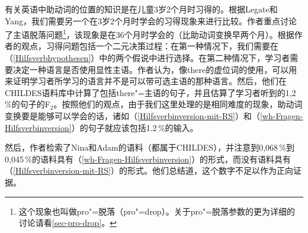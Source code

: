 \noindent
有关英语中助动词的位置的知识是在儿童3岁2个月时习得的。根据Legate和Yang，我们需要另一个在3岁2个月时学会的习得现象来进行比较。作者重点讨论了主语脱落问题\footnote{%
这个现象也叫做pro"=脱落（pro"=drop）。关于pro"=脱落参数的更为详细的讨论请看\ref{sec-pro-drop}。
}，该现象是在36个月时学会的（比助动词变换早两个月）。根据作者的观点，习得问题包括一个二元决策过程：在第一种情况下，我们需要在（\ref{Hilfsverbhypothesen}）中的两个假说中进行选择。在第二种情况下，学习者需要决定一种语言是否使用显性主语。作者认为，像there的虚位词的使用，可以用来证明学习者所学习的语言并不是可以带可选主语的那种语言。然后，他们在CHILDES语料库中计算了包括there"=主语的句子，并且估算了学习者听到的1,2\,\%的句子的F$_2$。按照他们的观点，由于我们这里处理的是相同难度的现象，助动词变换要是能够可以学会的话，诸如（\ref{Hilfsverbinversion-mit-RS}）和（\ref{wh-Fragen-Hilfsverbinversion}）的句子就应该包括1.2\,\%的输入。

然后，作者检索了Nina和Adam的语料（都属于CHILDES），并注意到0,068\,\%到0,045\,\%的语料具有（\ref{wh-Fragen-Hilfsverbinversion}）的形式，而没有语料具有（\ref{Hilfsverbinversion-mit-RS}）的形式。他们总结道，这个数字不足以作为正向证据。

